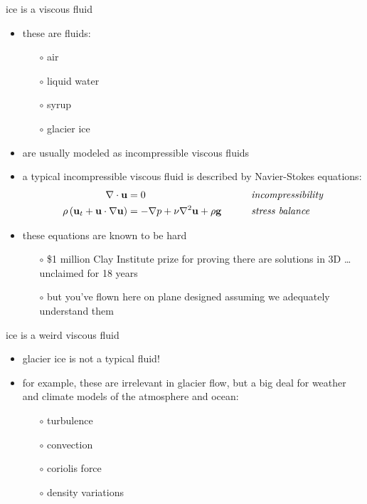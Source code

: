 \documentclass[10pt,hyperref={pdfpagelabels=true}]{beamer}
\begin{document}
\begin{frame}{ice is a viscous fluid}

\begin{itemize}
\item these are fluids:
  \begin{itemize}
  \item[$\circ$] air
  \item[$\circ$] liquid water
  \item[$\circ$] syrup
  \item[$\circ$] glacier ice
  \end{itemize}
\item are usually modeled as \alert{incompressible viscous fluids}
\item a typical incompressible viscous fluid is described by Navier-Stokes equations:
\begin{align*}
\nabla \cdot \mathbf{u} &= 0 &&\qquad \text{\emph{incompressibility}} \\
\rho \left(\mathbf{u}_t + \mathbf{u}\cdot\nabla \mathbf{u}\right) &= -\nabla p + \nu \nabla^2 \mathbf{u} + \rho \mathbf{g} &&\qquad \text{\emph{stress balance}}
\end{align*}

\small
\item these equations are known to be hard
  \begin{itemize}
  \item[$\circ$] \$1 million Clay Institute prize for proving there are solutions in 3D \dots unclaimed for 18 years
  \item[$\circ$] but you've flown here on plane designed assuming we adequately understand them
  \end{itemize}
\end{itemize}
\end{frame}


\begin{frame}{ice is a weird viscous fluid}

\begin{itemize}
\item glacier ice is not a typical fluid!
\item for example, these are \alert{irrelevant in glacier flow}, but a big deal for weather and climate models of the atmosphere and ocean:
  \begin{itemize}
  \item[$\circ$] turbulence
  \item[$\circ$] convection
  \item[$\circ$] coriolis force
  \item[$\circ$] density variations
  \end{itemize}
\end{itemize}
\end{frame}
\end{document}
